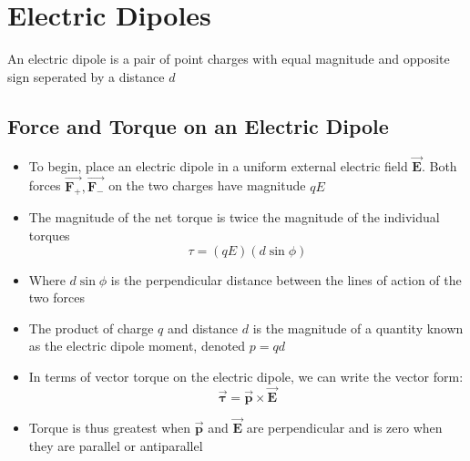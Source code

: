 \documentclass[11pt, a4paper]{article}
\begin{document}
\section[21.7, Electric Dipoles]{Electric Dipoles}
An electric dipole is a pair of point charges with equal magnitude and opposite
sign seperated by a distance $d$
\subsection{Force and Torque on an Electric Dipole}
\begin{itemize}
    \item To begin, place an electric dipole in a uniform external electric field
        $\vec{\mathbf{E}}$. Both forces $\vec{\mathbf{F_+}}, \vec{\mathbf{F_-}}$ on the two
        charges have magnitude $qE$
    \item The magnitude of the net torque is twice the magnitude of the individual
        torques
        \begin{equation}
            \tau = (qE)(d\sin\phi)
        \end{equation}
    \item Where $d\sin\phi$ is the perpendicular distance between the lines of action of
        the two forces
    \item The product of charge $q$ and distance $d$ is the magnitude of a quantity known
        as the electric dipole moment, denoted $p = qd$
    \item In terms of vector torque on the electric dipole, we can write the vector form:
        \begin{equation}
            \vec{\mathbf{\tau}} = \vec{\mathbf{p}} \times \vec{\mathbf{E}}
        \end{equation}
    \item Torque is thus greatest when $\vec{\mathbf{p}}$ and $\vec{\mathbf{E}}$ are
        perpendicular and is zero when they are parallel or antiparallel
\end{itemize}
\end{document}
